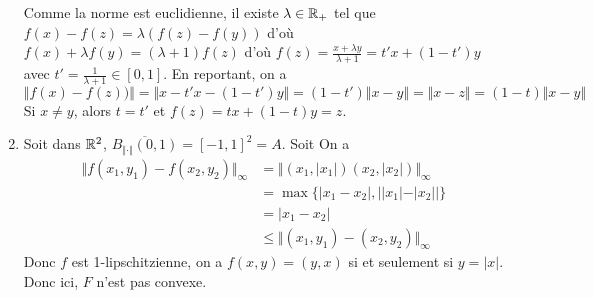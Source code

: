 \begin{solution}
\begin{enumerate}
		Comme la norme est euclidienne, il existe $\lambda\in\mathbb{R}_{+}$ tel que $f(x)-f(z)=\lambda(f(z)-f(y))$ d'où $f(x)+\lambda f(y)=(\lambda+1)f(z)$ d'où $f(z)=\frac{x+\lambda y}{\lambda+1}=t'x+(1-t')y$ avec $t'=\frac{1}{\lambda+1}\in[0,1]$. En reportant, on a 
		$$\Vert f(x)-f(z))\Vert=\Vert x-t'x-(1-t')y\Vert=(1-t')\Vert x-y\Vert=\Vert x-z\Vert=(1-t)\Vert x-y\Vert$$
		Si $x\neq y$, alors $t=t'$ et $f(z)=tx+(1-t)y=z$.

		\item Soit dans $\mathbb{R}^{2}$, $\overline{B_{\Vert\cdot\Vert}(0,1)}=[-1,1]^{2}=A$. Soit 
		On a 
		\begin{align*}
			\Vert f(x_{1},y_{1})-f(x_{2},y_{2})\Vert_{\infty}
			&= \Vert (x_{1},\vert x_{1}\vert)(x_{2},\vert x_{2}\vert)\Vert_{\infty}\\
			&=\max\{\vert x_{1}-x_{2}\vert, \bigl\vert\vert x_{1}\vert-\vert x_{2}\vert\bigr\vert\}\\
			&=\vert x_{1}-x_{2}\vert\\
			&\leqslant\Vert (x_{1},y_{1})-(x_{2},y_{2})\Vert_{\infty}
		\end{align*}
		Donc $f$ est 1-lipschitzienne, on a $f(x,y)=(y,x)$ si et seulement si $y=\vert x\vert$. Donc ici, $F$ n'est pas convexe.
	\end{enumerate}
\end{solution}

